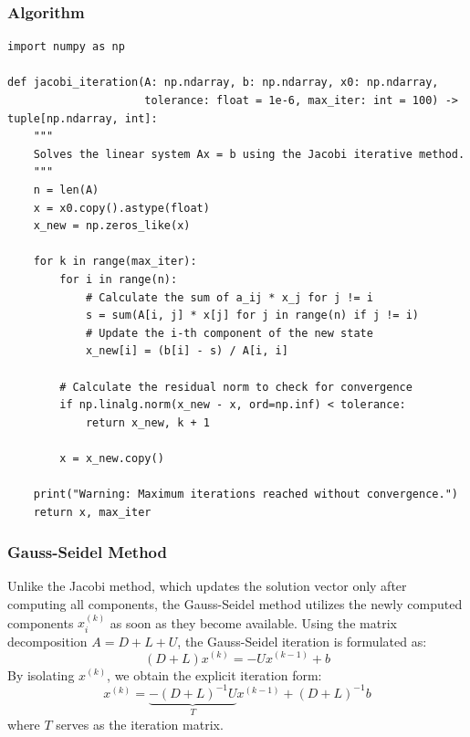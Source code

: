 \documentclass[12pt, a4paper]{article}
\theoremstyle{break}
\begin{document}
\subsubsection*{Algorithm}
\begin{lstlisting}
import numpy as np

def jacobi_iteration(A: np.ndarray, b: np.ndarray, x0: np.ndarray, 
                     tolerance: float = 1e-6, max_iter: int = 100) -> tuple[np.ndarray, int]:
    """
    Solves the linear system Ax = b using the Jacobi iterative method.
    """
    n = len(A)
    x = x0.copy().astype(float)
    x_new = np.zeros_like(x)

    for k in range(max_iter):
        for i in range(n):
            # Calculate the sum of a_ij * x_j for j != i
            s = sum(A[i, j] * x[j] for j in range(n) if j != i)
            # Update the i-th component of the new state
            x_new[i] = (b[i] - s) / A[i, i]

        # Calculate the residual norm to check for convergence
        if np.linalg.norm(x_new - x, ord=np.inf) < tolerance:
            return x_new, k + 1 

        x = x_new.copy()

    print("Warning: Maximum iterations reached without convergence.")
    return x, max_iter
\end{lstlisting}

\subsubsection{Gauss-Seidel Method}
Unlike the Jacobi method, which updates the solution vector only after computing all components, the Gauss-Seidel method utilizes the newly computed components $x_i^{(k)}$ as soon as they become available.
Using the matrix decomposition $A = D + L + U$, the Gauss-Seidel iteration is formulated as:
\begin{equation*}
    (D + L)x^{(k)} = -Ux^{(k-1)} + b
\end{equation*}
By isolating $x^{(k)}$, we obtain the explicit iteration form:
\begin{equation*}
    x^{(k)} = \underbrace{-(D + L)^{-1}U}_{T} x^{(k-1)} + (D + L)^{-1}b
\end{equation*}
where $T$ serves as the iteration matrix.
\end{document}
